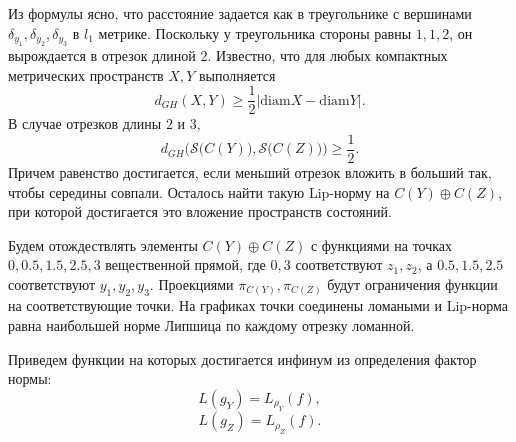 \documentclass[a4paper,12pt]{article}
\begin{document}
Из формулы ясно, что расстояние задается как в треугольнике с вершинами $ \delta_{y_1},\delta_{y_2}, \delta_{y_3} $ в $ l_1 $ метрике. Поскольку у треугольника стороны равны $ 1,1,2 $, он вырождается в отрезок длиной $ 2 $. Известно, что для любых компактных метрических пространств $ X,Y $ выполняется $$ d_{GH}(X,Y)\ge \frac{1}{2}|\text{diam}X-\text{diam}Y|. $$ 
В случае отрезков длины $ 2 $ и $ 3 $, $$d_{GH}\Big(\mathcal{S}\big(C(Y)\big),\mathcal{S}\big(C(Z)\big)\Big)\ge \frac{1}{2}.$$
Причем равенство достигается, если меньший отрезок вложить в больший так, чтобы середины совпали. Осталось найти такую Lip-норму на $ C(Y)\oplus C(Z) $, при которой достигается это вложение пространств состояний.

Будем отождествлять элементы $ C(Y)\oplus C(Z) $ с функциями на точках $0,0.5,1.5,2.5,3$ вещественной прямой, где $0,3$ соответствуют $ z_1,z_2 $, а $ 0.5,1.5,2.5 $ соответствуют $y_1,y_2,y_3$. Проекциями $ \pi_{C(Y)}, \pi_{C(Z)} $ будут ограничения функции на соответствующие точки. На графиках точки соединены ломаными и Lip-норма равна наибольшей норме Липшица по каждому отрезку ломанной.


Приведем функции на которых достигается инфинум из определения фактор нормы:
$$ L(g_Y) = L_{\rho_Y}(f), $$
$$L(g_Z)=L_{\rho_Z}(f). $$


\end{document}
